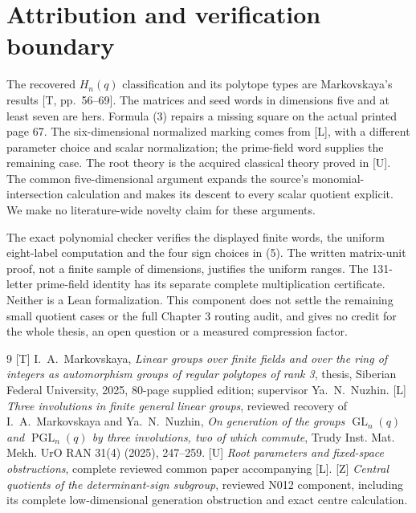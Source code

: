 \documentclass[11pt,a4paper]{article}
\newcommand{\GL}{\operatorname{GL}}
\begin{document}
\section{Attribution and verification boundary}
The recovered $H_n(q)$ classification and its polytope types are
Markovskaya's results [T, pp.~56--69]. The matrices and seed words in dimensions five and at least seven
are hers. Formula
(3) repairs a missing square on the actual printed page 67.
The six-dimensional normalized marking comes from [L], with a
different parameter choice and scalar normalization; the prime-field
word supplies the remaining case. The root theory is the acquired
classical theory proved in [U]. The common five-dimensional argument
expands the source's monomial-intersection calculation and makes its
descent to every scalar quotient explicit. We make no literature-wide
novelty claim for these arguments.

The exact polynomial checker verifies the displayed finite words,
the uniform eight-label computation and the four sign choices in
(5). The written matrix-unit proof, not a finite sample of dimensions,
justifies the uniform ranges. The 131-letter prime-field identity has
its separate complete multiplication certificate. Neither is a Lean
formalization. This component does not settle the remaining small
quotient cases or the full Chapter 3 routing audit, and gives no
credit for the whole thesis, an open question or a measured compression factor.

\begin{thebibliography}{9}\small
{}[T] I.~A.~Markovskaya, \emph{Linear groups over finite fields
and over the ring of integers as automorphism groups of regular
polytopes of rank 3}, thesis, Siberian Federal University, 2025,
80-page supplied edition; supervisor Ya.~N.~Nuzhin.
[L] \emph{Three involutions in finite general linear groups},
reviewed recovery of I.~A.~Markovskaya and Ya.~N.~Nuzhin,
\emph{On generation of the groups $\GL_n(q)$ and $\operatorname{PGL}_n(q)$
by three involutions, two of which commute}, Trudy Inst. Mat. Mekh.
UrO RAN 31(4) (2025), 247--259.
[U] \emph{Root parameters and fixed-space obstructions},
complete reviewed common paper accompanying [L].
[Z] \emph{Central quotients of the determinant-sign subgroup},
reviewed N012 component, including its complete low-dimensional
generation obstruction and exact centre calculation.
\end{thebibliography}
\end{document}
